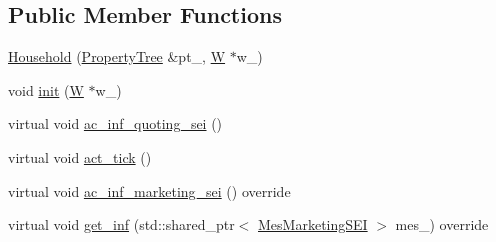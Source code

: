 \subsection*{Public Member Functions}
{\bf }\par
\begin{DoxyCompactItemize}
\item 
\hyperlink{classsolar__core_1_1_household_a5f84bf614d0ec70abf9597ec97e07b1a}{Household} (\hyperlink{namespacesolar__core_adeda2737d6938c190eb774a5b2495045}{Property\+Tree} \&pt\+\_\+, \hyperlink{classsolar__core_1_1_w}{W} $\ast$w\+\_\+)
\item 
void \hyperlink{classsolar__core_1_1_household_ab8c15758602643f2290ef1b9ddf2a2ca}{init} (\hyperlink{classsolar__core_1_1_w}{W} $\ast$w\+\_\+)
\end{DoxyCompactItemize}

{\bf }\par
\begin{DoxyCompactItemize}
\item 
virtual void \hyperlink{classsolar__core_1_1_household_a165b7c64c72e5ed4ea08307e32082517}{ac\+\_\+inf\+\_\+quoting\+\_\+sei} ()
\item 
virtual void \hyperlink{classsolar__core_1_1_household_a1e7d20a60dc42b8d09a8d23a4cdb26a6}{act\+\_\+tick} ()
\end{DoxyCompactItemize}

{\bf }\par
\begin{DoxyCompactItemize}
\item 
virtual void \hyperlink{classsolar__core_1_1_household_add38a49b76c2836a50a89e75318414f1}{ac\+\_\+inf\+\_\+marketing\+\_\+sei} () override
\item 
virtual void \hyperlink{classsolar__core_1_1_household_ac9d26af7b52f0cdc357fc5dca4b86ad9}{get\+\_\+inf} (std\+::shared\+\_\+ptr$<$ \hyperlink{classsolar__core_1_1_mes_marketing_s_e_i}{Mes\+Marketing\+S\+E\+I} $>$ mes\+\_\+) override
\end{DoxyCompactItemize}

